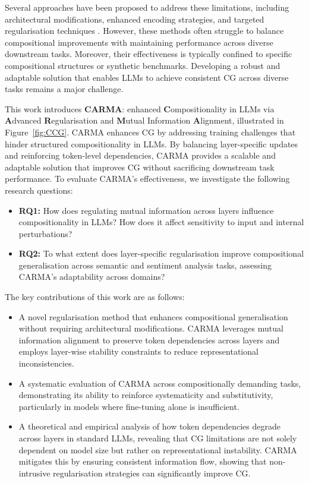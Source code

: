 Several approaches have been proposed to address these limitations, including architectural modifications, enhanced encoding strategies, and targeted regularisation techniques \cite{ontanon-etal-2022-making, murty-etal-2023-pushdown, csordas-etal-2021-devil}. However, these methods often struggle to balance compositional improvements with maintaining performance across diverse downstream tasks. Moreover, their effectiveness is typically confined to specific compositional structures or synthetic benchmarks. Developing a robust and adaptable solution that enables LLMs to achieve consistent CG across diverse tasks remains a major challenge. 



This work introduces \textbf{CARMA}: enhanced \textbf{C}ompositionality in LLMs via \textbf{A}dvanced \textbf{R}egularisation and \textbf{M}utual Information \textbf{A}lignment,  illustrated in Figure~\ref{fig:CCG}. CARMA enhances CG by addressing training challenges that hinder structured compositionality in LLMs. By balancing layer-specific updates and reinforcing token-level dependencies, CARMA provides a scalable and adaptable solution that improves CG without sacrificing downstream task performance. To evaluate CARMA's effectiveness, we investigate the following research questions:  

\begin{itemize}
    \item \textbf{RQ1:} How does regulating mutual information across layers influence compositionality in LLMs? How does it affect sensitivity to input and internal perturbations?  
    \item \textbf{RQ2:} To what extent does layer-specific regularisation improve compositional generalisation across semantic and sentiment analysis tasks, assessing CARMA's adaptability across domains?
\end{itemize}

\noindent The key contributions of this work are as follows:

\begin{itemize}
    \item A novel regularisation method that enhances compositional generalisation without requiring architectural modifications. CARMA leverages mutual information alignment to preserve token dependencies across layers and employs layer-wise stability constraints to reduce representational inconsistencies. 
    
    \item A systematic evaluation of CARMA across compositionally demanding tasks, demonstrating its ability to reinforce systematicity and substitutivity, particularly in models where fine-tuning alone is insufficient.  
    \item A theoretical and empirical analysis of how token dependencies degrade across layers in standard LLMs, revealing that CG limitations are not solely dependent on model size but rather on representational instability. CARMA mitigates this by ensuring consistent information flow, showing that non-intrusive regularisation strategies can significantly improve CG. 
\end{itemize}

